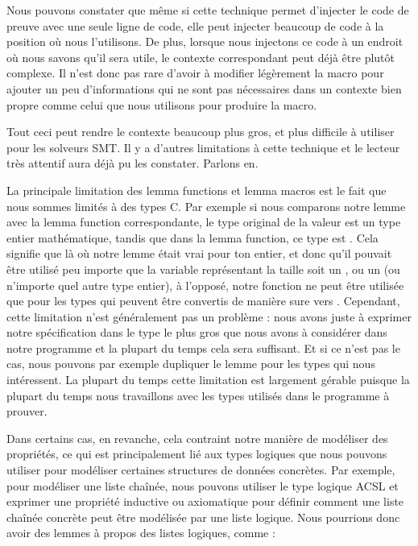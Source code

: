 Nous pouvons constater que même si cette technique permet d'injecter le code de
preuve avec une seule ligne de code, elle peut injecter beaucoup de code à la
position où nous l'utilisons. De plus, lorsque nous injectons ce code à un endroit
où nous savons qu'il sera utile, le contexte correspondant peut déjà être plutôt
complexe. Il n'est donc pas rare d'avoir à modifier légèrement la macro pour
ajouter un peu d'informations qui ne sont pas nécessaires dans un contexte bien
propre comme celui que nous utilisons pour produire la macro.


Tout ceci peut rendre le contexte beaucoup plus gros, et plus difficile à utiliser
pour les solveurs SMT. Il y a d'autres limitations à cette technique et le lecteur
très attentif aura déjà pu les constater. Parlons en.





La principale limitation des lemma functions et lemma macros est le fait que nous
sommes limités à des types C. Par exemple si nous comparons notre lemme
 avec la lemma function correspondante,
le type original de la valeur  est un type entier mathématique,
tandis que dans la lemma function, ce type est . Cela signifie
que là où notre lemme était vrai pour ton entier, et donc qu'il pouvait être 
utilisé peu importe que la variable représentant la taille soit un ,
ou un  (ou n'importe quel autre type entier), à l'opposé, notre
fonction ne peut être utilisée que pour les types qui peuvent être convertis de
manière sure vers . Cependant, cette limitation n'est
généralement pas un problème : nous avons juste à exprimer notre spécification dans
le type le plus gros que nous avons à considérer dans notre programme et la plupart
du temps cela sera suffisant. Et si ce n'est pas le cas, nous pouvons par exemple
dupliquer le lemme pour les types qui nous intéressent. La plupart du temps cette
limitation est largement gérable puisque la plupart du temps nous travaillons avec
les types utilisés dans le programme à prouver.


Dans certains cas, en revanche, cela contraint notre manière de modéliser des
propriétés, ce qui est principalement lié aux types logiques que nous pouvons
utiliser pour modéliser certaines structures de données concrètes. Par exemple,
pour modéliser une liste chaînée, nous pouvons utiliser le type logique ACSL
 et exprimer une propriété inductive ou
axiomatique pour définir comment une liste chaînée concrète peut être modélisée
par une liste logique. Nous pourrions donc avoir des lemmes à propos des listes
logiques, comme :

